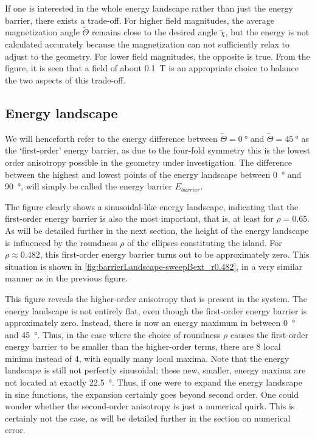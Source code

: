 \documentclass[11pt,a4paper,english]{article}
\begin{document}
If one is interested in the whole energy landscape rather than just the energy barrier, there exists a trade-off. For higher field magnitudes, the average magnetization angle $\widetilde{\Theta}$ remains close to the desired angle $\widetilde{\chi}$, but the energy is not calculated accurately because the magnetization can not sufficiently relax to adjust to the geometry. For lower field magnitudes, the opposite is true. From the figure, it is seen that a field of about \SI{0.1}{\tesla} is an appropriate choice to balance the two aspects of this trade-off. \par

\subsection{Energy landscape}
We will henceforth refer to the energy difference between $\widetilde{\Theta} = \SI{0}{\degree}$ and $\widetilde{\Theta} = \SI{45}{\degree}$ as the `first-order' energy barrier, as due to the four-fold symmetry this is the lowest order anisotropy possible in the geometry under investigation. The difference between the highest and lowest points of the energy landscape between \SI{0}{\degree} and \SI{90}{\degree}, will simply be called the energy barrier $E_{barrier}$. \par
The figure clearly shows a sinusoidal-like energy landscape, indicating that the first-order energy barrier is also the most important, that is, at least for $\rho=0.65$. As will be detailed further in the next section, the height of the energy landscape is influenced by the roundness $\rho$ of the ellipses constituting the island. For $\rho \approx 0.482$, this first-order energy barrier turns out to be approximately zero. This situation is shown in \cref{fig:barrierLandscape-sweepBext_r0.482}, in a very similar manner as in the previous figure. \par
This figure reveals the higher-order anisotropy that is present in the system. The energy landscape is not entirely flat, even though the first-order energy barrier is approximately zero. Instead, there is now an energy maximum in between \SI{0}{\degree} and \SI{45}{\degree}. Thus, in the case where the choice of roundness $\rho$ causes the first-order energy barrier to be smaller than the higher-order terms, there are 8 local minima instead of 4, with equally many local maxima. Note that the energy landscape is still not perfectly sinusoidal; these new, smaller, energy maxima are not located at exactly \SI{22.5}{\degree}. Thus, if one were to expand the energy landscape in sine functions, the expansion certainly goes beyond second order. One could wonder whether the second-order anisotropy is just a numerical quirk. This is certainly not the case, as will be detailed further in the section on numerical error.
\end{document}
